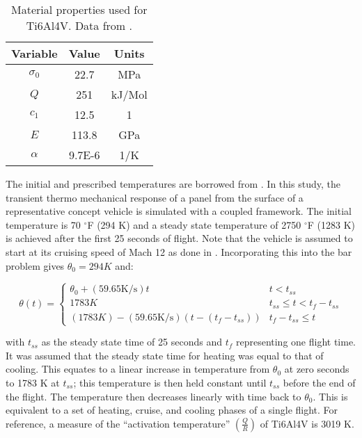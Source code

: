 \documentclass[conf]{new-aiaa}
\begin{document}
\begin{table}[H]
  \centering
  \caption{
    Material properties used for Ti6Al4V.
    Data from 
    \cite{ lavina_creep_behavior_of_Ti6Al4V_from_450C_to_600C,
      boyer_materials_properties_handbook_titanium_alloys}.}
  \begin{tabular}{|c|c|c|}
    \hline
    Variable & Value & Units  \\
    \hline
    $\sigma_0$ & 22.7  & MPa    \\
    $Q$      & 251     & kJ/Mol \\
    $c_1$    & 12.5    & 1      \\
    $E$      & 113.8   & GPa    \\
    $\alpha$ & 9.7E-6  & 1/K    \\
    \hline
  \end{tabular}
  \label{tab_material_properties}
\end{table}


The initial and prescribed temperatures are borrowed from 
\cite{ culler_impact_of_FTS_coupling_on_response_prediction_hypersonic_skin_panels}.
In this study, the transient thermo mechanical response of a panel from the 
surface of a representative concept vehicle is simulated with a coupled framework.
The initial temperature is 70 $^{\circ}$F (294 K) and a steady state temperature 
of 2750 $^{\circ}$F (1283 K) is achieved after the first 25 seconds of flight.
Note that the vehicle is assumed to start at its cruising speed of Mach 12
as done in \cite{ culler_impact_of_FTS_coupling_on_response_prediction_hypersonic_skin_panels}.
Incorporating this into the bar problem
gives $\theta_0 = 294 K$ and:

\begin{equation}
\theta(t) = \begin{cases}
 \theta_0 + (59.65 \text{K/s})t                & t < t_{ss} \\
1783 K                                         & t_{ss} \leq t < t_f-t_{ss} \\
(1783 K) - (59.65 \text{K/s})(t-(t_f-t_{ss}))  & t_f - t_{ss} \leq t
\end{cases}
\end{equation}

\noindent
with $t_{ss}$ as the steady state time of 25 seconds
and $t_f$ representing one flight time.
It was assumed that the steady state time for heating was
equal to that of cooling.
This equates to a linear increase in temperature from 
$\theta_0$ at zero seconds to 1783 K at $t_{ss}$;
this temperature is then held constant until $t_{ss}$ before
the end of the flight.
The temperature then decreases linearly with time back to $\theta_0$.
This is equivalent to a set of heating, cruise, and cooling phases of a single flight.
For reference, a measure of the ``activation temperature'' 
$\left(\frac{Q}{R}\right)$ of Ti6Al4V is 3019 K.
\end{document}
